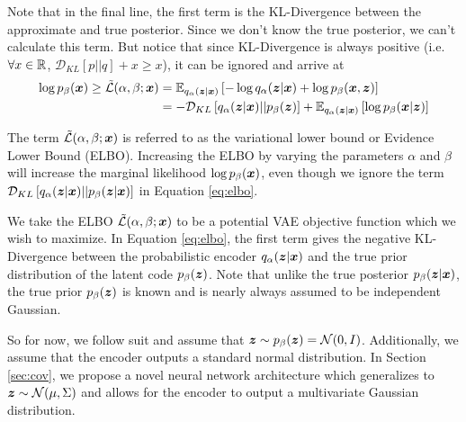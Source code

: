 Note that in the final line, the first term is the KL-Divergence between the approximate and true posterior. Since we don't know the true posterior, we can't calculate this term. But notice that since KL-Divergence is always positive (i.e. $\forall x \in \mathbb{R}$, $\mathcal{D}_{KL}[p||q] + x \geq x$), it can be ignored and arrive at
\begin{equation}
  \begin{split}
    \log p_\beta (\boldsymbol{x}) \geq \tilde{\mathcal{L}}(\alpha, \beta; \boldsymbol{x}) &= \mathbb{E}_{q_\alpha(\boldsymbol{z} | \boldsymbol{x})}\left[ -\log q_\alpha(\boldsymbol{z} | \boldsymbol{x}) + \log p_{\beta}(\boldsymbol{x}, \boldsymbol{z}) \right] \\
    &= -\mathcal{D}_{KL}\left[ q_\alpha(\boldsymbol{z} | \boldsymbol{x}) || p_{\beta}(\boldsymbol{z}) \right] + \mathbb{E}_{q_\alpha(\boldsymbol{z} | \boldsymbol{x})}\left[ \log p_{\beta}(\boldsymbol{x} | \boldsymbol{z}) \right]
  \label{eq:elbo}
\end{split}
\end{equation}

The term $\tilde{\mathcal{L}}(\alpha, \beta; \boldsymbol{x})$ is referred to as the variational lower bound or Evidence Lower Bound (ELBO). Increasing the ELBO by varying the parameters $\alpha$ and $\beta$ will increase the marginal likelihood $\log p_\beta(\boldsymbol{x})$, even though we ignore the term $\mathcal{D}_{KL}\left[ q_\alpha (\boldsymbol{z} | \boldsymbol{x}) || p_\beta(\boldsymbol{z} | \boldsymbol{x}) \right]$ in Equation \ref{eq:elbo}.

We take the ELBO $\tilde{\mathcal{L}}(\alpha,\beta; \boldsymbol{x})$ to be a potential VAE objective function which we wish to maximize. In Equation \ref{eq:elbo}, the first term gives the negative KL-Divergence between the probabilistic encoder $q_\alpha(\boldsymbol{z} | \boldsymbol{x})$ and the true prior distribution of the latent code $p_\beta(\boldsymbol{z})$. Note that unlike the true posterior $p_\beta(\boldsymbol{z} | \boldsymbol{x})$, the true prior $p_\beta(\boldsymbol{z})$ is known and is nearly always assumed to be independent Gaussian. 

So for now, we follow suit and assume that $\boldsymbol{z} \sim p_\beta(\boldsymbol{z}) = \mathcal{N}(0,I)$. Additionally, we assume that the encoder outputs a standard normal distribution. In Section \ref{sec:cov}, we propose a novel neural network architecture which generalizes to $\boldsymbol{z} \sim \mathcal{N}(\mu, \Sigma)$ and allows for the encoder to output a multivariate Gaussian distribution.

